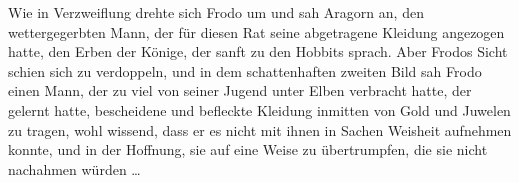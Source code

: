 Wie in Verzweiflung drehte sich Frodo um und sah Aragorn an, den wettergegerbten Mann, der für diesen Rat seine abgetragene Kleidung angezogen hatte, den Erben der Könige, der sanft zu den Hobbits sprach. Aber Frodos Sicht schien sich zu verdoppeln, und in dem schattenhaften zweiten Bild sah Frodo einen Mann, der zu viel von seiner Jugend unter Elben verbracht hatte, der gelernt hatte, bescheidene und befleckte Kleidung inmitten von Gold und Juwelen zu tragen, wohl wissend, dass er es nicht mit ihnen in Sachen Weisheit aufnehmen konnte, und in der Hoffnung, sie auf eine Weise zu übertrumpfen, die sie nicht nachahmen würden …

